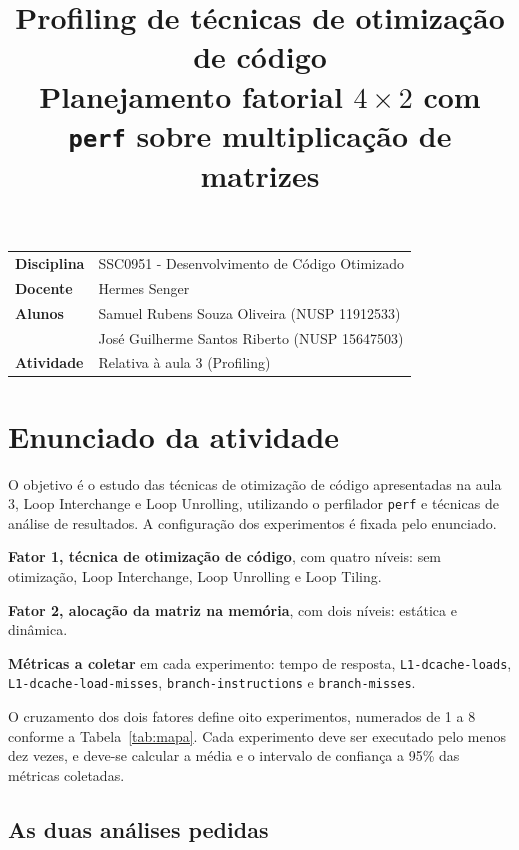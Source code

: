\documentclass[11pt,a4paper]{article}
\title{\vspace{-1.4cm}\textbf{Profiling de técnicas de otimização de código}\\[0.25em]
\large Planejamento fatorial $4\times2$ com \texttt{perf} sobre multiplicação de matrizes}
\author{}
\date{}
\begin{document}
\maketitle
\vspace{-2.2cm}

\begin{center}
\begin{tabular}{@{}ll@{}}
\toprule
\textbf{Disciplina} & SSC0951 - Desenvolvimento de Código Otimizado \\
\textbf{Docente}    & Hermes Senger \\
\textbf{Alunos}     & Samuel Rubens Souza Oliveira (NUSP 11912533) \\
                    & José Guilherme Santos Riberto (NUSP 15647503) \\
\textbf{Atividade}  & Relativa à aula 3 (Profiling) \\
\bottomrule
\end{tabular}
\end{center}

\section{Enunciado da atividade}

O objetivo é o estudo das técnicas de otimização de código apresentadas na aula 3,
Loop Interchange e Loop Unrolling, utilizando o perfilador \texttt{perf} e técnicas de
análise de resultados. A configuração dos experimentos é fixada pelo enunciado.

\textbf{Fator 1, técnica de otimização de código}, com quatro níveis: sem otimização,
Loop Interchange, Loop Unrolling e Loop Tiling.

\textbf{Fator 2, alocação da matriz na memória}, com dois níveis: estática e dinâmica.

\begin{sloppypar}
\textbf{Métricas a coletar} em cada experimento: tempo de resposta,
\texttt{L1-dcache-loads}, \texttt{L1-dcache-load-misses}, \texttt{branch-instructions}
e \texttt{branch-misses}.
\end{sloppypar}

O cruzamento dos dois fatores define oito experimentos, numerados de 1 a 8 conforme a
Tabela~\ref{tab:mapa}. Cada experimento deve ser executado pelo menos dez vezes, e
deve-se calcular a média e o intervalo de confiança a 95\% das métricas coletadas.

\subsection*{As duas análises pedidas}
\end{document}

